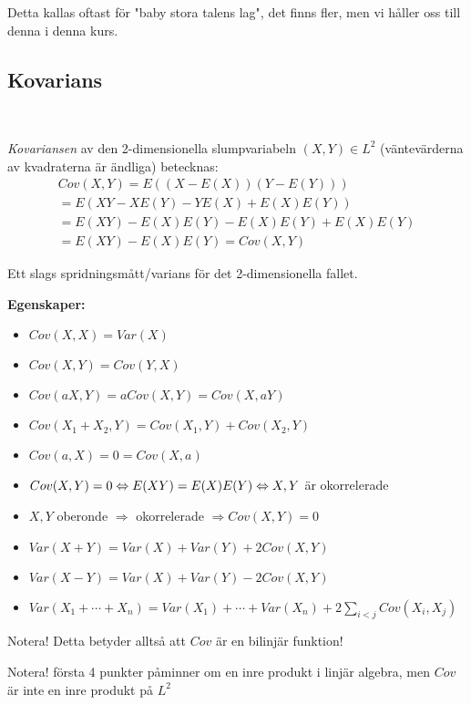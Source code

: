 \par\bigskip
\noindent Detta kallas oftast för "baby stora talens lag", det finns fler, men vi håller oss till denna i denna kurs.
\par\bigskip
\subsection{Kovarians}\hfill\\\par
\noindent \textit{Kovariansen} av den 2-dimensionella slumpvariabeln $(X,Y)\in L^2$ (väntevärderna av kvadraterna är ändliga) betecknas:
\begin{equation*}
  \begin{gathered}
    Cov(X,Y) = E\left((X-E(X))(Y-E(Y))\right)\\
    = E(XY-XE(Y)-YE(X)+E(X)E(Y))\\
    = E(XY)-E(X)E(Y)-E(X)E(Y)+E(X)E(Y)\\
    = E(XY)-E(X)E(Y) = Cov(X,Y)
  \end{gathered}
\end{equation*}\par
\noindent Ett slags spridningsmått/varians för det 2-dimensionella fallet.
\par\bigskip
\noindent\textbf{Egenskaper:}\par
\begin{itemize}
  \item $Cov(X,X) = Var(X)$
  \item $Cov(X,Y) = Cov(Y,X)$
  \item $Cov(aX,Y) = aCov(X,Y) = Cov(X,aY)$
  \item $Cov(X_1+X_2,Y) = Cov(X_1,Y)+Cov(X_2,Y)$
  \item $Cov(a,X) = 0 = Cov(X,a)$
  \item $Cov(X,Y) = 0\Leftrightarrow E(XY) = E(X)E(Y)\Leftrightarrow X,Y$ är okorrelerade
  \item $X,Y$ oberonde $\Rightarrow$ okorrelerade $\Rightarrow Cov(X,Y) = 0$
  \item $Var(X+Y) = Var(X)+Var(Y)+2Cov(X,Y)$
  \item $Var(X-Y) = Var(X)+Var(Y)-2Cov(X,Y)$
  \item $Var(X_1+\cdots+X_n) = Var(X_1)+\cdots+Var(X_n)+2\sum_{i<j} Cov(X_i,X_j)$
\end{itemize}\par
\noindent Notera! Detta betyder alltså att $Cov$ är en bilinjär funktion!\par
\noindent Notera! första 4 punkter påminner om en inre produkt i linjär algebra, men $Cov$ är inte en inre produkt på $L^2$
